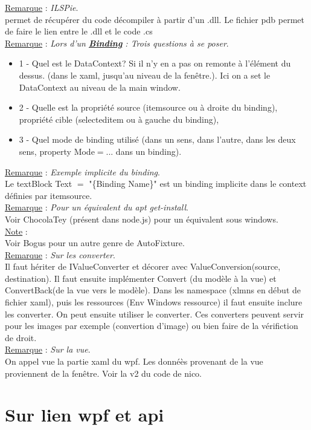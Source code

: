 \documentclass[a4paper,12pt,twoside]{article}
\newcommand{\urlcolor}{magenta}  %
\newcommand{\keycolor}{purple} %
\newcommand{\rem}[2]{\noindent\underline{Remarque} : \textit{#1}.\\ \indent #2}
\newcommand{\note}[1]{\noindent\underline{Note} : \\ \indent #1}
\newcommand{\keyref}[2]{\hypersetup{urlcolor=\keycolor} \href{#1}{\textbf{#2}}\hypersetup{urlcolor=\urlcolor}}
\begin{document}
\rem{ILSPie}{permet de récupérer du code décompiler à partir d'un .dll. Le fichier pdb permet de faire le lien entre le .dll et le code .cs}\\

\rem{Lors d'un \keyref{https://docs.microsoft.com/en-us/dotnet/desktop/wpf/data/?view=netdesktop-5.0}{Binding} : Trois questions à se poser}{\begin{itemize}
\item 1 - Quel est le DataContext? Si il n'y en a pas on remonte à l'élément du dessus. (dans le xaml, jusqu'au niveau de la fenêtre.). Ici on a set le DataContext au niveau de la main window.
\item 2 - Quelle est la propriété source (itemsource ou à droite du binding), propriété cible (selecteditem ou à gauche du binding),
\item 3 - Quel mode de binding utilisé (dans un sens, dans l'autre, dans les deux sens, property Mode$=$... dans un binding).\\
\end{itemize}}

\rem{Exemple implicite du binding}{Le textBlock Text $=$ "\{Binding Name\}" est un binding implicite dans le context définies par itemsource}.\\

\rem{Pour un équivalent du apt get-install}{Voir ChocolaTey (présent dans node.js) pour un équivalent sous windows.}\\

\note{Voir Bogus pour un autre genre de AutoFixture.}\\

\rem{Sur les converter}{Il faut hériter de IValueConverter et décorer avec ValueConversion(source, destination). Il faut ensuite implémenter Convert (du modèle à la vue) et ConvertBack(de la vue vers le modèle). Dans les namespace (xlmns en début de fichier xaml), puis les ressources (Env Windows ressource) il faut ensuite inclure les converter. On peut ensuite utiliser le converter. Ces converters peuvent servir pour les images par exemple (convertion d'image) ou bien faire de la vérifiction de droit.}\\

\rem{Sur la vue}{On appel vue la partie xaml du wpf. Les donnéès provenant de la vue proviennent de la fenêtre. Voir la v2 du code de nico.}\\


\section{Sur lien wpf et api}
\end{document}
